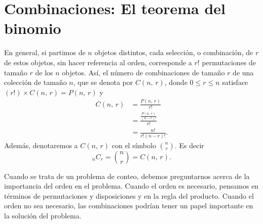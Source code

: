 \newpage

\section{Combinaciones: El teorema del binomio}\label{sec:TEOREMADEBINOMIO}

\begin{BOX}
    En general, si partimos de $n$ objetos distintos, cada selección, o combinación, de $r$ de estos objetos, sin hacer referencia al orden, corresponde a $r!$ permutaciones de tamaño $r$ de los $n$ objetos. Así, el número de combinaciones de tamaño $r$ de una colección de tamaño $n$, que se denota por $C(n, \, r)$, donde $0 \leq r \leq n$ satisface $(r!) \times C(n, \, r) = P(n, \, r)$ y
    \begin{align*}
        C(n, \, r) & = \frac{P(n, \, r)}{r!} \\
        & = \frac{\displaystyle\frac{P(n, \, r)}{(n-r)!}}{r!} \\
        & = \frac{n!}{r! (n-r)!}.
    \end{align*}
    Además, denotaremos a $C(n, \, r)$ con el símbolo $\displaystyle \binom{n}{r}$. Es decir
    $${}_nC_r = \binom{n}{r} = C(n, \, r).$$
\end{BOX}

\begin{importante}
    Cuando se trata de un problema de conteo, debemos preguntarnos acerca de la importancia del orden en el problema. Cuando el orden es necesario, pensamos en términos de permutaciones y disposiciones y en la regla del producto. Cuando el orden no sea necesario, las combinaciones podrían tener un papel importante en la solución del problema.
\end{importante}

